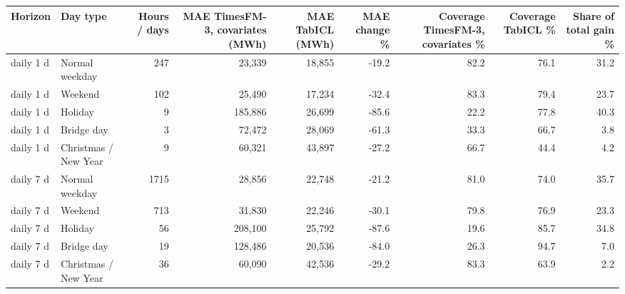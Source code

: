 \begin{tabular}{llrrrrrrr}
\toprule
Horizon & Day type & Hours / days & MAE TimesFM-3, covariates (MWh) & MAE TabICL (MWh) & MAE change \% & Coverage TimesFM-3, covariates \% & Coverage TabICL \% & Share of total gain \% \\
\midrule
daily 1 d & Normal weekday & 247 & 23,339 & 18,855 & -19.2 & 82.2 & 76.1 & 31.2 \\
daily 1 d & Weekend & 102 & 25,490 & 17,234 & -32.4 & 83.3 & 79.4 & 23.7 \\
daily 1 d & Holiday & 9 & 185,886 & 26,699 & -85.6 & 22.2 & 77.8 & 40.3 \\
daily 1 d & Bridge day & 3 & 72,472 & 28,069 & -61.3 & 33.3 & 66.7 & 3.8 \\
daily 1 d & Christmas / New Year & 9 & 60,321 & 43,897 & -27.2 & 66.7 & 44.4 & 4.2 \\
daily 7 d & Normal weekday & 1715 & 28,856 & 22,748 & -21.2 & 81.0 & 74.0 & 35.7 \\
daily 7 d & Weekend & 713 & 31,830 & 22,246 & -30.1 & 79.8 & 76.9 & 23.3 \\
daily 7 d & Holiday & 56 & 208,100 & 25,792 & -87.6 & 19.6 & 85.7 & 34.8 \\
daily 7 d & Bridge day & 19 & 128,486 & 20,536 & -84.0 & 26.3 & 94.7 & 7.0 \\
daily 7 d & Christmas / New Year & 36 & 60,090 & 42,536 & -29.2 & 83.3 & 63.9 & 2.2 \\
\bottomrule
\end{tabular}

